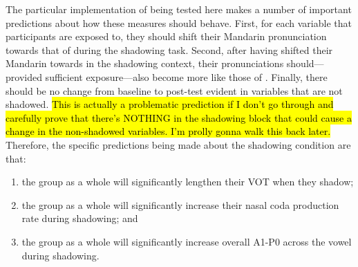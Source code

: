     The particular implementation of \cbat{} being tested here makes a number of important predictions about how these measures should behave. %
    First, for each variable that participants are exposed to, they should shift their Mandarin pronunciation towards that of \annie{} during the shadowing task. Second, after having shifted their Mandarin towards \annie{} in the shadowing context, their \ND{} pronunciations should---provided sufficient exposure---also become more like those of \annie{}. Finally, there should be no change from baseline to post-test evident in variables that are not shadowed. \hl{This is actually a problematic prediction if I don't go through and carefully prove that there's NOTHING in the shadowing block that could cause a change in the non-shadowed variables. I'm prolly gonna walk this back later.} Therefore, the specific predictions being made about the shadowing condition are that:
    \begin{enumerate}
        \item the group as a whole will significantly lengthen their VOT when they shadow; \label{hyp:VOT_longer_in_shad}
        \item the group as a whole will significantly increase their nasal coda production rate during shadowing; and \label{hyp:more_codas_in_shad}
        \item the group as a whole will significantly increase overall A1-P0 across the vowel during shadowing. \label{hyp:a1p0_higher_in_shad}
    \end{enumerate}
